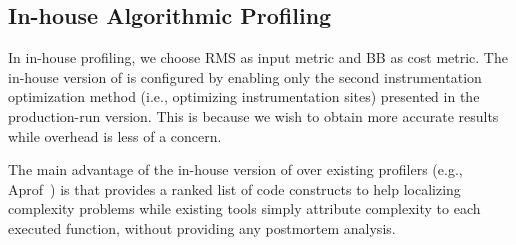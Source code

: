 \subsection{In-house Algorithmic Profiling}
\label{sec:in-house}


In in-house profiling, we choose RMS as input metric 
and BB as cost  metric.  
The in-house version of \Tool is configured by enabling
only the second instrumentation optimization method (i.e.,
optimizing instrumentation sites) presented 
in the production-run version. This is because we wish 
to obtain more accurate results while overhead is less of 
a concern.  

The main advantage of the in-house version of \Tool 
over existing profilers (e.g., Aprof~\cite{Aprof1,Aprof2}) is that 
\Tool provides a ranked list of code constructs to
help localizing complexity problems while 
existing tools simply attribute complexity to each executed function, 
without providing any postmortem analysis. 




